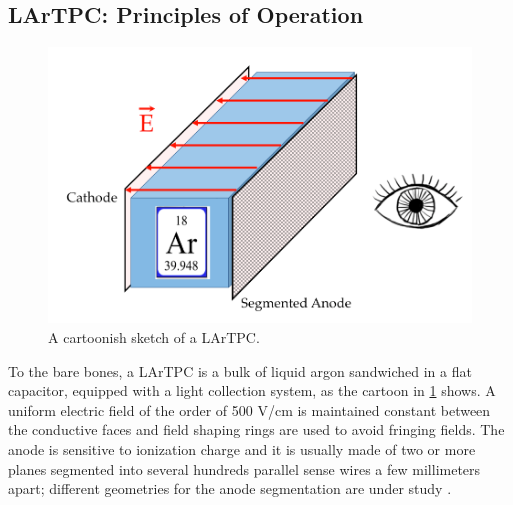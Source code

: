 \subsection{LArTPC: Principles of Operation}\label{sec:LArTPCWorkingPrinciple}

\begin{figure}[hbpt]
\centering
\includegraphics[width=\textwidth]{Chapter-2/Images/Cartoon.png}
\caption{A cartoonish sketch of a LArTPC.}
\label{fig:cartoon}
\end{figure}


To the bare bones, a LArTPC is a bulk of liquid argon sandwiched in a flat capacitor, equipped with a light collection system, as the cartoon in \ref{fig:cartoon} shows. A uniform electric field of the order of 500 V/cm is maintained constant between the conductive faces and field shaping rings are used to avoid fringing fields. The anode is sensitive to ionization charge and it is usually made of two or more planes segmented into several hundreds parallel sense wires a few millimeters apart; different geometries for the anode segmentation are under study \cite{1748-0221-8-07-P07002}. 


